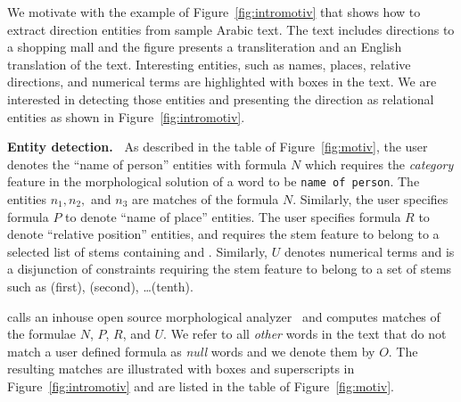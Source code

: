 We motivate \framework with the example of Figure~\ref{fig:intromotiv} 
that shows how to extract direction entities from sample Arabic text. 
The text includes directions to a shopping mall and the 
figure presents a transliteration and an English translation of the text.
Interesting entities, such as names, places, relative directions, 
and numerical terms are highlighted with boxes in the text. 
We are interested in detecting those entities and presenting 
the direction as relational entities as 
shown in Figure~\ref{fig:intromotiv}.



{\bf Entity detection.~}
As described in the table of Figure~\ref{fig:motiv}, the user denotes 
the ``name of person'' entities with formula $N$ 
which requires the {\em category} feature in the morphological solution of a word
to be {\tt name of person}. 
The entities $n_1,n_2,$ and $n_3$ are matches of the formula $N$. 
Similarly, the user specifies formula $P$ to denote ``name of place'' entities. 
The user specifies formula 
$R$ to denote ``relative position'' entities, and requires the stem feature to belong 
to a selected list of 
stems containing  and . 
Similarly, $U$ denotes numerical terms and is a disjunction of constraints 
requiring the stem feature to belong to a set of stems such as
(first), (second), \dots {}(tenth).

\framework calls an inhouse open source morphological 
analyzer~\cite{ZaMaColing2012DemosSarf} and computes matches of 
the formulae $N$, $P$, $R$, and $U$. 
We refer to all {\em other} words in the text that do not match 
a user defined formula as {\em null} words and we denote them by $O$. 
The resulting matches are illustrated with boxes and superscripts 
in Figure~\ref{fig:intromotiv} and are listed in the table of 
Figure~\ref{fig:motiv}.

